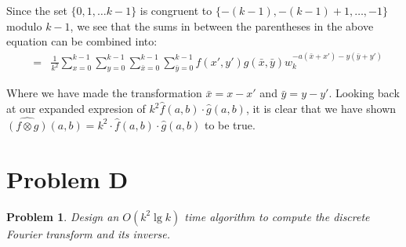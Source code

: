 \documentclass[psamsfonts]{amsart}
\newtheorem{prob}{Problem}[section]
\newenvironment{sol}{{\bfseries Solution}}{\qedsymbol}
\theoremstyle{definition}
\theoremstyle{remark}
\numberwithin{equation}{section}
\begin{document}
\begin{sol}
Since the set $\{0, 1, \ldots k-1\}$ is congruent to $\{-(k-1), -(k-1)+1, \ldots, -1\}$ modulo $k-1$, we see that the sums in between the parentheses in the above equation can be combined into:
\begin{eqnarray}
&=& \frac{1}{k^2} \sum_{x=0}^{k-1} \sum_{y=0}^{k-1} \sum_{\bar{x}=0}^{k-1} \sum_{\bar{y} = 0}^{k-1} f(x',y') g(\bar{x},\bar{y}) w_k^{-a(\bar{x} + x') - y (\bar{y} + y') } 
\end{eqnarray} 

Where we have made the transformation $\bar{x} = x - x'$ and $\bar{y} = y - y'$. Looking back at our expanded expresion of $k^2 \widehat{f}(a,b) \cdot \widehat{g}(a,b)$, it is clear that we have shown $\widehat{(f\otimes g)}(a,b) = k^2\cdot\widehat{f}(a,b)\cdot\widehat{g}(a,b)$ to be true.
\end{sol}

\section{Problem D}

\begin{prob}
Design an $O(k^2 \lg k)$ time algorithm to compute the discrete Fourier transform and its
inverse.
\end{prob}
\end{document}
